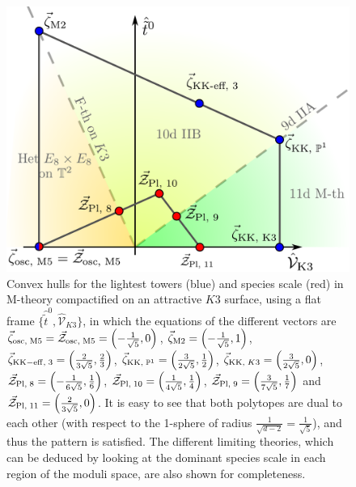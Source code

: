 \begin{figure}[htb]
	\begin{center}
		\includegraphics[scale=.35]{Mth_K3.pdf}
		\caption{\small Convex hulls for the lightest towers (blue) and species scale (red) in M-theory compactified on an attractive $K3$ surface, using a flat frame $\lbrace \hat{\tilde{t}}^0, \hat{\mathcal{V}}_{K3}\rbrace$, in which the equations of the different vectors are $\vec{\zeta}_{\rm osc,\; M5}=\vec{\mathcal{Z}}_{\rm osc,\; M5}=\left(-\frac{1}{\sqrt{5}},0\right)$, $\vec{\zeta}_{\rm M2}=\left(-\frac{1}{\sqrt{5}},1\right)$, $\vec{\zeta}_{\rm KK-eff,\; 3}=\left(\frac{2}{3\sqrt{5}},\frac{2}{3}\right)$, $\vec{\zeta}_{{\rm KK},\; \mathbb{P}^1}=\left(\frac{3}{2\sqrt{5}},\frac{1}{2}\right)$, $\vec{\zeta}_{{\rm KK},\; K3}=\left(\frac{3}{2\sqrt{5}},0\right)$, $\vec{\mathcal{Z}}_{\rm Pl,\; 8}=\left(-\frac{1}{6\sqrt{5}},\frac{1}{6}\right)$, $\vec{\mathcal{Z}}_{\rm Pl,\; 10}=\left(\frac{1}{4\sqrt{5}},\frac{1}{4}\right)$, $\vec{\mathcal{Z}}_{\rm Pl,\; 9}=\left(\frac{3}{7\sqrt{5}},\frac{1}{7}\right)$ and $\vec{\mathcal{Z}}_{\rm Pl,\; 11}=\left(\frac{2}{3\sqrt{5}},0\right)$. It is easy to see that both polytopes are dual to each other (with respect to the 1-sphere of radius $\frac{1}{\sqrt{d-2}}=\frac{1}{\sqrt{5}}$), and thus the pattern is satisfied. The different limiting theories, which can be deduced by looking at the dominant species scale in each region of the moduli space, are also shown for completeness.} 
		\label{fig:CHMthy7d}
	\end{center}
\end{figure}
	

